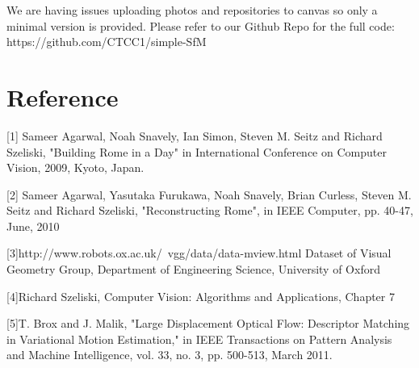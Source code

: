 \documentclass[10pt]{article}
\begin{document}
We are having issues uploading photos and repositories to canvas so only a minimal version is provided. Please refer to our Github Repo for the full code: 
https://github.com/CTCC1/simple-SfM 

\section*{Reference}

[1] Sameer Agarwal, Noah Snavely, Ian Simon, Steven M. Seitz and Richard Szeliski, "Building Rome in a Day" in International Conference on Computer Vision, 2009, Kyoto, Japan.

[2] Sameer Agarwal, Yasutaka Furukawa, Noah Snavely, Brian Curless, Steven M. Seitz and Richard Szeliski, "Reconstructing Rome", in IEEE Computer, pp. 40-47, June, 2010 

[3]http://www.robots.ox.ac.uk/~vgg/data/data-mview.html
Dataset of Visual Geometry Group, Department of Engineering Science, University of Oxford

[4]Richard Szeliski, Computer Vision: Algorithms and Applications, Chapter 7

[5]T. Brox and J. Malik, "Large Displacement Optical Flow: Descriptor Matching in Variational Motion Estimation," in IEEE Transactions on Pattern Analysis and Machine Intelligence, vol. 33, no. 3, pp. 500-513, March 2011.
\end{document}

